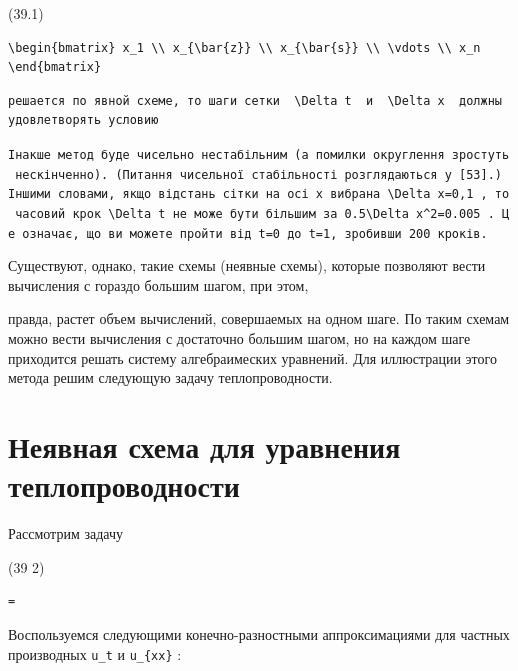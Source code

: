 \documentclass[
  ukrainian,
]{article}
\begin{document}
(39.1)

\begin{verbatim}
\begin{bmatrix} x_1 \\ x_{\bar{z}} \\ x_{\bar{s}} \\ \vdots \\ x_n \end{bmatrix}
\end{verbatim}

\begin{verbatim}
решается по явной схеме, то шаги сетки  \Delta t  и  \Delta x  должны удовлетворять условию
\end{verbatim}

\texttt{Інакше\ метод\ буде\ чисельно\ нестабільним\ (а\ помилки\ округлення\ зростуть\ нескінченно).\ (Питання\ чисельної\ стабільності\ розглядаються\ у\ {[}53{]}.)\ Іншими\ словами,\ якщо\ відстань\ сітки\ на\ осі\ x\ вибрана\ \textquotesingle{}\textbackslash{}Delta\ x=0,1\textquotesingle{}\ ,\ то\ часовий\ крок\ \textquotesingle{}\textbackslash{}Delta\ t\textquotesingle{}\ не\ може\ бути\ більшим\ за\ \textquotesingle{}0.5\textbackslash{}Delta\ x\^{}2=0.005\textquotesingle{}\ .\ Це\ означає,\ що\ ви\ можете\ пройти\ від\ t=0\ до\ t=1,\ зробивши\ 200\ кроків.}

Существуют, однако, такие схемы (неявные схемы), которые позволяют вести
вычисления с гораздо большим шагом, при этом,

правда, растет объем вычислений, совершаемых на одном шаге. По таким
схемам можно вести вычисления с достаточно большим шагом, но на каждом
шаге приходится решать систему алгебраимеских уравнений. Для иллюстрации
этого метода решим следующую задачу теплопроводности.

\section{Неявная схема для уравнения
теплопроводности}\label{ux43dux435ux44fux432ux43dux430ux44f-ux441ux445ux435ux43cux430-ux434ux43bux44f-ux443ux440ux430ux432ux43dux435ux43dux438ux44f-ux442ux435ux43fux43bux43eux43fux440ux43eux432ux43eux434ux43dux43eux441ux442ux438}

Рассмотрим задачу

(39 2)

\begin{verbatim}
=
\end{verbatim}

Воспользуемся следующими конечно-разностными аппроксимациями для частных
производных \texttt{u\_t} и \texttt{u\_\{xx\}} :
\end{document}
